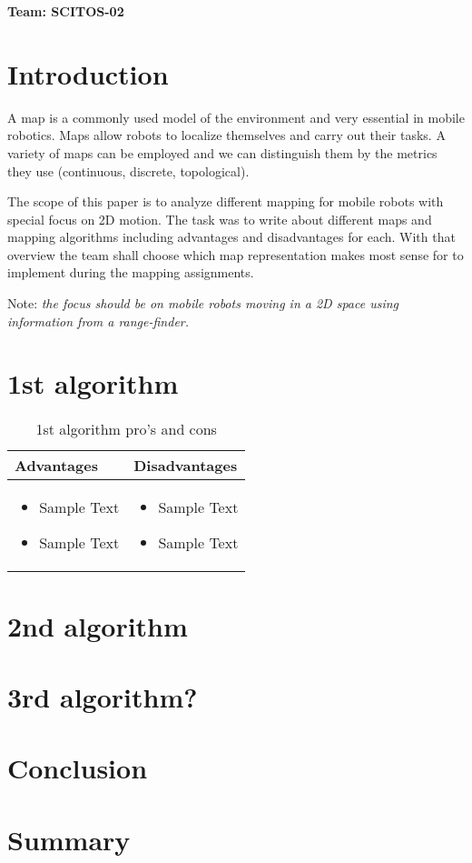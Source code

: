 \documentclass[12pt, a4paper, onecolumn]{article}
\begin{document}
\textbf{Team: SCITOS-02}

\section{Introduction}
A map is a commonly used model of the environment and very essential in mobile robotics. Maps allow robots to localize themselves and carry out their tasks. A variety of maps can be employed and we can distinguish them by the metrics they use (continuous, discrete, topological).\par
The scope of this paper is to analyze different mapping for mobile robots with special focus on 2D motion. The task was to write about different maps and mapping algorithms including advantages and disadvantages for each. With that overview the team shall choose which map representation makes most sense for to implement during the mapping assignments. \par
Note: \emph{ the focus should be on mobile robots moving in a 2D space using information from a range-finder.}

\section{1st algorithm}
\begin{table}[h!]
\centering
\begin{tabular}{ |p{7cm}||p{7cm}|  }
 \hline
 Advantages&Disadvantages\\
 \hline
\begin{itemize}
  \item Sample Text
  \item Sample Text
  \end{itemize} 
  & 
  \begin{itemize}
  \item Sample Text
  \item Sample Text
  \end{itemize} \\

 \hline
\end{tabular}
\caption{1st algorithm pro's and cons }
\label{table:1}
\end{table}
\section{2nd algorithm}

\section{3rd algorithm?}

\section{Conclusion}

\section{Summary}
\end{document}
